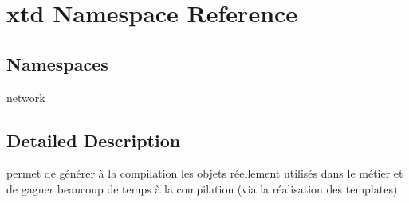 \hypertarget{namespacextd}{}\section{xtd Namespace Reference}
\label{namespacextd}
\subsection*{Namespaces}
\begin{DoxyCompactItemize}
\item 
 \hyperlink{namespacextd_1_1network}{network}
\end{DoxyCompactItemize}


\subsection{Detailed Description}
permet de générer à la compilation les objets réellement utilisés dans le métier et de gagner beaucoup de temps à la compilation (via la réalisation des templates) 